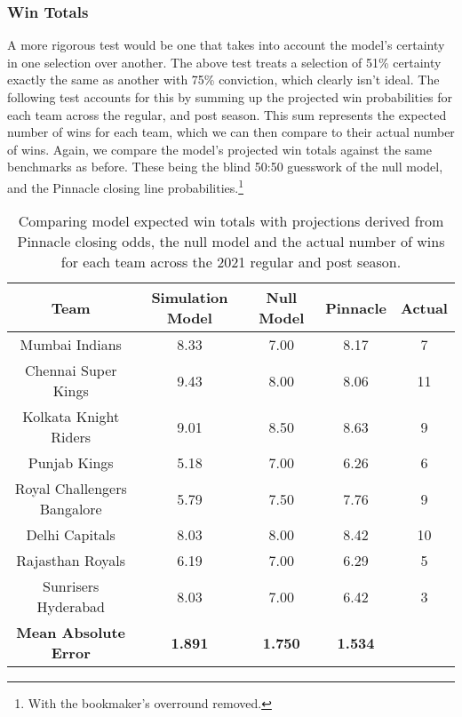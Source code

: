 
\subsubsection{Win Totals}

A more rigorous test would be one that takes into account the model's certainty in one selection over another. The above test treats a selection of 51\% certainty exactly the same as another with 75\% conviction, which clearly isn't ideal. The following test accounts for this by summing up the projected win probabilities for each team across the regular, and post season. This sum represents the expected number of wins for each team, which we can then compare to their actual number of wins. Again, we compare the model's projected win totals against the same benchmarks as before. These being the blind 50:50 guesswork of the null model, and the Pinnacle closing line probabilities.\footnote{With the bookmaker's overround removed.}

\begin{table}[ht]
\vspace{0.5em}
\centering
\begin{tabular} {c c c c c} \toprule
    {Team} & {Simulation Model} & {Null Model} & {Pinnacle} & {Actual} \\ \midrule
     Mumbai Indians & 8.33 & 7.00 & 8.17 & 7 \\
     Chennai Super Kings & 9.43 & 8.00 & 8.06 & 11 \\
     Kolkata Knight Riders & 9.01 & 8.50 & 8.63 & 9 \\
     Punjab Kings & 5.18 & 7.00 & 6.26 & 6 \\
     Royal Challengers Bangalore & 5.79 & 7.50 & 7.76 & 9 \\
     Delhi Capitals & 8.03 & 8.00 & 8.42 & 10 \\
     Rajasthan Royals & 6.19 & 7.00 & 6.29 & 5 \\
     Sunrisers Hyderabad & 8.03 & 7.00 & 6.42 & 3 \\ \midrule
     \textbf{Mean Absolute Error} & \textbf{1.891} & \textbf{1.750} & \textbf{1.534} & \\ \bottomrule
\end{tabular}
\caption{Comparing model expected win totals with projections derived from Pinnacle closing odds, the null model and the actual number of wins for each team across the 2021 regular and post season.}
\label{table: ex wins}
\end{table}

